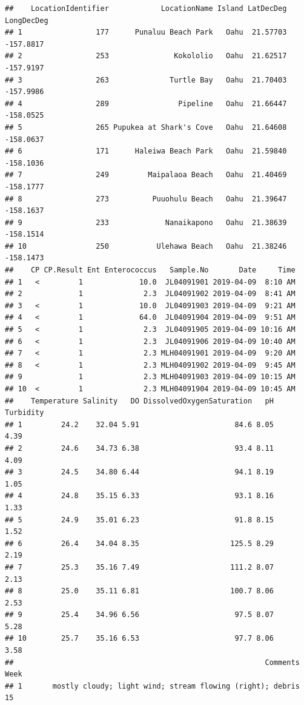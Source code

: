 \documentclass[12pt,]{article}
\begin{document}
\begin{verbatim}
##    LocationIdentifier            LocationName Island LatDecDeg LongDecDeg
## 1                 177      Punaluu Beach Park   Oahu  21.57703  -157.8817
## 2                 253               Kokololio   Oahu  21.62517  -157.9197
## 3                 263              Turtle Bay   Oahu  21.70403  -157.9986
## 4                 289                Pipeline   Oahu  21.66447  -158.0525
## 5                 265 Pupukea at Shark's Cove   Oahu  21.64608  -158.0637
## 6                 171      Haleiwa Beach Park   Oahu  21.59840  -158.1036
## 7                 249         Maipalaoa Beach   Oahu  21.40469  -158.1777
## 8                 273          Puuohulu Beach   Oahu  21.39647  -158.1637
## 9                 233             Nanaikapono   Oahu  21.38639  -158.1514
## 10                250           Ulehawa Beach   Oahu  21.38246  -158.1473
##    CP CP.Result Ent Enterococcus   Sample.No       Date     Time
## 1   <         1             10.0  JL04091901 2019-04-09  8:10 AM
## 2             1              2.3  JL04091902 2019-04-09  8:41 AM
## 3   <         1             10.0  JL04091903 2019-04-09  9:21 AM
## 4   <         1             64.0  JL04091904 2019-04-09  9:51 AM
## 5   <         1              2.3  JL04091905 2019-04-09 10:16 AM
## 6   <         1              2.3  JL04091906 2019-04-09 10:40 AM
## 7   <         1              2.3 MLH04091901 2019-04-09  9:20 AM
## 8   <         1              2.3 MLH04091902 2019-04-09  9:45 AM
## 9             1              2.3 MLH04091903 2019-04-09 10:15 AM
## 10  <         1              2.3 MLH04091904 2019-04-09 10:45 AM
##    Temperature Salinity   DO DissolvedOxygenSaturation   pH Turbidity
## 1         24.2    32.04 5.91                      84.6 8.05      4.39
## 2         24.6    34.73 6.38                      93.4 8.11      4.09
## 3         24.5    34.80 6.44                      94.1 8.19      1.05
## 4         24.8    35.15 6.33                      93.1 8.16      1.33
## 5         24.9    35.01 6.23                      91.8 8.15      1.52
## 6         26.4    34.04 8.35                     125.5 8.29      2.19
## 7         25.3    35.16 7.49                     111.2 8.07      2.13
## 8         25.0    35.11 6.81                     100.7 8.06      2.53
## 9         25.4    34.96 6.56                      97.5 8.07      5.28
## 10        25.7    35.16 6.53                      97.7 8.06      3.58
##                                                          Comments Week
## 1       mostly cloudy; light wind; stream flowing (right); debris   15

\end{verbatim}
\end{document}
